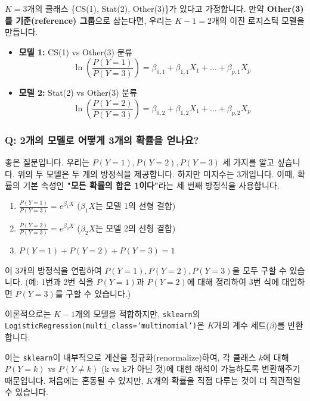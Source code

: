 \documentclass[11pt,a4paper]{book}
\theoremstyle{definition}
\begin{document}
\begin{examplebox}[title=비유: 학생 전공 예측]
$K=3$개의 클래스 \{CS(1), Stat(2), Other(3)\}가 있다고 가정합니다.
만약 \textbf{Other(3)를 기준(reference) 그룹}으로 삼는다면, 우리는 $K-1=2$개의 이진 로지스틱 모델을 만듭니다.

\begin{itemize}
    \item \textbf{모델 1:} CS(1) vs Other(3) 분류
    $$ \ln\left(\frac{P(Y=1)}{P(Y=3)}\right) = \beta_{0,1} + \beta_{1,1}X_1 + \dots + \beta_{p,1}X_p $$
    
    \item \textbf{모델 2:} Stat(2) vs Other(3) 분류
    $$ \ln\left(\frac{P(Y=2)}{P(Y=3)}\right) = \beta_{0,2} + \beta_{1,2}X_1 + \dots + \beta_{p,2}X_p $$
\end{itemize}
\end{examplebox}

\subsubsection{Q: 2개의 모델로 어떻게 3개의 확률을 얻나요?}

좋은 질문입니다. 우리는 $P(Y=1), P(Y=2), P(Y=3)$ 세 가지를 알고 싶습니다.
위의 두 모델은 두 개의 방정식을 제공합니다. 하지만 미지수는 3개입니다.
이때, 확률의 기본 속성인 \textbf{"모든 확률의 합은 1이다"}라는 세 번째 방정식을 사용합니다.

\begin{enumerate}
    \item $\frac{P(Y=1)}{P(Y=3)} = e^{\beta_1 X}$  ($\beta_1 X$는 모델 1의 선형 결합)
    \item $\frac{P(Y=2)}{P(Y=3)} = e^{\beta_2 X}$  ($\beta_2 X$는 모델 2의 선형 결합)
    \item $P(Y=1) + P(Y=2) + P(Y=3) = 1$
\end{enumerate}

이 3개의 방정식을 연립하여 $P(Y=1), P(Y=2), P(Y=3)$을 모두 구할 수 있습니다.
(예: 1번과 2번 식을 $P(Y=1)$과 $P(Y=2)$에 대해 정리하여 3번 식에 대입하면 $P(Y=3)$를 구할 수 있습니다.)

\begin{warningbox}[title=sklearn 라이브러리 사용 시 참고]
이론적으로는 $K-1$개의 모델을 적합하지만, \texttt{sklearn}의 \texttt{LogisticRegression(multi\_class='multinomial')}은 $K$개의 계수 세트($\beta$)를 반환합니다.

이는 \texttt{sklearn}이 내부적으로 계산을 정규화(renormalize)하여, 각 클래스 $k$에 대해 $P(Y=k)$ vs $P(Y \neq k)$ (k vs k가 아닌 것)에 대한 해석이 가능하도록 변환해주기 때문입니다. 처음에는 혼동될 수 있지만, $K$개의 확률을 직접 다루는 것이 더 직관적일 수 있습니다.
\end{warningbox}
\end{document}
